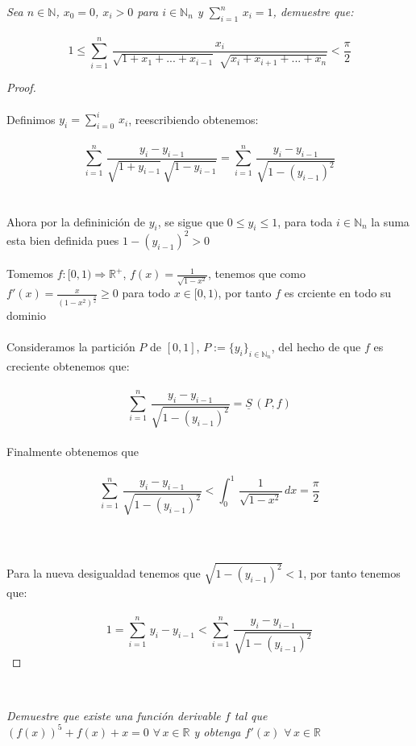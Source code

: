 \documentclass[11pt,letterpaper]{article}
\newcommand{\R}{\mathbb{R}}
\newcommand{\N}{\mathbb{N}}
\begin{document}
\begin{tcolorbox}[
	title = \textcolor{black}{\textcolor{white}{Problema 2}},]
\textit{Sea $n\in \N$, $x_0=0$, $x_i>0$ para $i\in \N_n$ y $\sum_{i=1}^{n}\,x_i=1$, demuestre que:\,\\
\,\\
\begin{equation*}
    1\leq \sum_{i=1}^{n}\,\frac{x_i}{\sqrt{1+x_1+...+x_{i-1}}\,\,\sqrt{x_i+x_{i+1}+...+x_n}}<\frac{\pi}{2}
\end{equation*}
}
\end{tcolorbox}
\begin{proof}\,\\
    \,\\
    Definimos $y_i=\sum_{i=0}^i\,x_i$, reescribiendo obtenemos:\,\\
    \,\\
    \begin{equation*}
        \sum_{i=1}^{n}\,\frac{y_i-y_{i-1}}{\sqrt{1+y_{i-1}}\,\sqrt{1-y_{i-1}}}= \sum_{i=1}^{n}\,\frac{y_i-y_{i-1}}{\sqrt{1-(y_{i-1})^2}}
    \end{equation*}\,\\
    \,\\
     Ahora por la defininici\'on de $y_i$, se sigue que $0\leq y_i\leq 1$, para toda $i\in \N_n$
     la suma esta bien definida pues $1-(y_{i-1})^2>0$\,\\
     \,\\
    Tomemos $f:[0,1)\Rightarrow \R^+$, $f(x)=\frac{1}{\sqrt{1-x^2}}$, tenemos que
    como $f'(x)=\frac{x}{(1-x^2)^{\frac{3}{2}}}\geq 0$ para todo $x\in [0,1)$, por tanto $f$ es crciente
    en todo su dominio\,\\
    \,\\
    Consideramos la partici\'on $P$ de $[0,1]$, $P:=\{y_i\}_{i\in \N_n}$, del hecho de que 
    $f$ es creciente obtenemos que:\,\\
    \,\\
    \begin{equation*}
        \sum_{i=1}^{n}\,\frac{y_i-y_{i-1}}{\sqrt{1-(y_{i-1})^2}}=\underline{S}\,(P,f)
    \end{equation*}\,\\
    Finalmente obtenemos que\,\\
    \,\\
    \begin{equation*}
        \sum_{i=1}^{n}\,\frac{y_i-y_{i-1}}{\sqrt{1-(y_{i-1})^2}}<\int_{0}^{1}\,\frac{1}{\sqrt{1-x^2}}\,dx=\frac{\pi}{2}
    \end{equation*}\,\\
    \,\\
    \newpage
    \,\\
    Para la nueva desigualdad tenemos que $\sqrt{1-(y_{i-1})^2}<1$, por tanto tenemos que:\,\\
    \,\\
    \begin{equation*}
         1=\sum_{i=1}^{n}\,y_i-y_{i-1} < \sum_{i=1}^{n}\,\frac{y_i-y_{i-1}}{\sqrt{1-(y_{i-1})^2}}
    \end{equation*}
\end{proof}\,\\
\begin{tcolorbox}[
	title = \textcolor{black}{\textcolor{white}{Problema 5}},]
\textit{Demuestre que existe una funci\'on derivable $f$ tal que $(f(x))^5+f(x)+x=0$ $\forall\,x\in \R$ y obtenga
$f'(x)$ $\forall\,x\in \R$
}
\end{tcolorbox}
\end{document}
